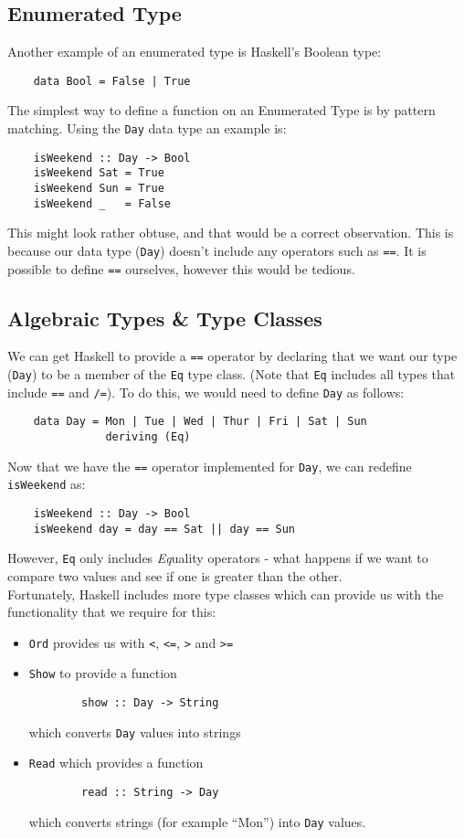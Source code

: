 \subsection{Enumerated Type}
Another example of an enumerated type is Haskell's Boolean type:
\begin{verbatim}
    data Bool = False | True
\end{verbatim}

The simplest way to define a function on an Enumerated Type is by pattern matching. Using the \verb|Day| data type an example is:
\begin{verbatim}
    isWeekend :: Day -> Bool
    isWeekend Sat = True
    isWeekend Sun = True
    isWeekend _   = False
\end{verbatim}

This might look rather obtuse, and that would be a correct observation. This is because our data type (\verb|Day|) doesn't include any operators such as \verb|==|. It is possible to define \verb|==| ourselves, however this would be tedious.

\subsection{Algebraic Types \& Type Classes}
We can get Haskell to provide a \verb|==| operator by declaring that we want our type (\verb|Day|) to be a member of the \verb|Eq| type class. (Note that \verb|Eq| includes all types that include \verb|==| and \verb|/=|). To do this, we would need to define \verb|Day| as follows:
\begin{verbatim}
    data Day = Mon | Tue | Wed | Thur | Fri | Sat | Sun
               deriving (Eq)
\end{verbatim}

Now that we have the \verb|==| operator implemented for \verb|Day|, we can redefine \verb|isWeekend| as:
\begin{verbatim}
    isWeekend :: Day -> Bool
    isWeekend day = day == Sat || day == Sun
\end{verbatim}

However, \verb|Eq| only includes \textit{Eq}uality operators - what happens if we want to compare two values and see if one is greater than the other.\\

Fortunately, Haskell includes more type classes which can provide us with the functionality that we require for this:
\begin{itemize}
    \item \verb|Ord| provides us with \verb|<|, \verb|<=|, \verb|>| and \verb|>=|
    \item \verb|Show| to provide a function
    \begin{verbatim}
        show :: Day -> String
    \end{verbatim}
    which converts \verb|Day| values into strings
    \item \verb|Read| which provides a function
    \begin{verbatim}
        read :: String -> Day
    \end{verbatim}
    which converts strings (for example ``Mon'') into \verb|Day| values.
\end{itemize}

